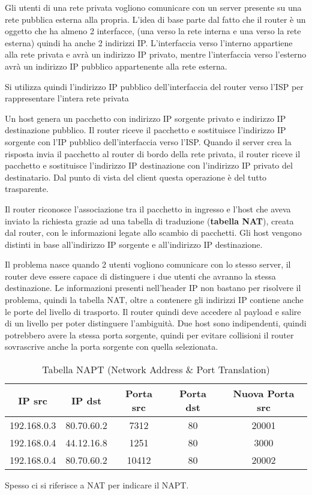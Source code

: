 \documentclass[a4paper]{article}
\begin{document}
\begin{example}
  Gli utenti di una rete privata vogliono comunicare con un server presente su una rete
  pubblica esterna alla propria. L'idea di base parte dal fatto che il router è un
  oggetto che ha almeno 2 interfacce, (una verso la rete interna e una verso la rete esterna)
  quindi ha anche 2 indirizzi IP. L'interfaccia verso l'interno appartiene alla rete
  privata e avrà un indirizzo IP privato, mentre l'interfaccia verso l'esterno avrà un
  indirizzo IP pubblico appartenente alla rete esterna.

  \vspace{1em}
  \noindent
  Si utilizza quindi l'indirizzo IP pubblico dell'interfaccia del router verso l'ISP
  per rappresentare l'intera rete privata
  \label{27-11-D4}

  \noindent
  Un host genera un pacchetto con indirizzo IP sorgente privato e indirizzo IP destinazione
  pubblico. Il router riceve il pacchetto e sostituisce l'indirizzo IP sorgente con l'IP
  pubblico dell'interfaccia verso l'ISP. Quando il server crea la risposta invia il
  pacchetto al router di bordo della rete privata, il router riceve il pacchetto e
  sostituisce l'indirizzo IP destinazione con l'indirizzo IP privato del destinatario.
  \label{27-11-D5}
  \noindent
  Dal punto di vista del client questa operazione è del tutto trasparente.
\end{example}

\noindent
Il router riconosce l'associazione tra il pacchetto in ingresso e l'host che aveva
inviato la richiesta grazie ad una tabella di traduzione (\textbf{tabella NAT}), creata 
dal router, con le informazioni legate allo scambio di pacchetti. Gli host vengono
distinti in base all'indirizzo IP sorgente e all'indirizzo IP destinazione.

\vspace{1em}
\noindent
Il problema
nasce quando 2 utenti vogliono comunicare con lo stesso server, il router deve essere
capace di distinguere i due utenti che avranno la stessa destinazione.
Le informazioni presenti nell'header IP non bastano per risolvere il problema, quindi
la tabella NAT, oltre a contenere gli indirizzi IP contiene anche le porte del livello
di trasporto. Il router quindi deve accedere al payload e salire di un livello per
poter distinguere l'ambiguità. Due host sono indipendenti, quindi potrebbero avere
la stessa porta sorgente, quindi per evitare collisioni il router sovrascrive anche
la porta sorgente con quella selezionata.
\begin{table}[H]
  \centering
  \begin{tabular}{c|c|c|c|c}
    IP src& IP dst & Porta src & Porta dst & Nuova Porta src\\
    \hline
    192.168.0.3 & 80.70.60.2 & 7312 & 80 & 20001 \\
    192.168.0.4 & 44.12.16.8 & 1251 & 80 & 3000 \\
    192.168.0.4 & 80.70.60.2 & 10412 & 80 & 20002 \\
  \end{tabular}
  \caption{Tabella NAPT (Network Address \& Port Translation)}
\end{table}
\noindent
Spesso ci si riferisce a NAT per indicare il NAPT.
\end{document}
